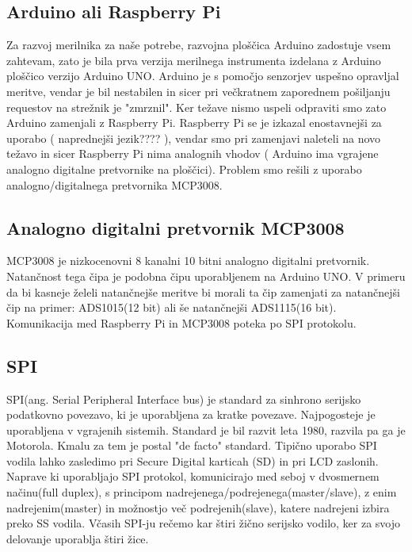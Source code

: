 \documentclass[12pt,a4paper,titlepage,openany]{report}
\begin{document}
\subsection{Arduino ali Raspberry Pi}
Za razvoj merilnika za naše potrebe, razvojna ploščica Arduino zadostuje vsem zahtevam, zato je bila prva verzija merilnega instrumenta izdelana z Arduino ploščico verzijo Arduino UNO. Arduino je s pomočjo senzorjev uspešno opravljal meritve, vendar je bil nestabilen in sicer pri večkratnem zaporednem pošiljanju requestov na strežnik  je "zmrznil". Ker težave nismo uspeli odpraviti smo zato Arduino zamenjali z Raspberry Pi. Raspberry Pi se je izkazal enostavnejši za uporabo ( naprednejši jezik???? ), vendar smo pri zamenjavi naleteli na novo težavo in sicer Raspberry Pi nima analognih vhodov ( Arduino ima vgrajene analogno digitalne pretvornike na ploščici). Problem smo rešili z uporabo analogno/digitalnega pretvornika MCP3008.

\subsection{Analogno digitalni pretvornik MCP3008}
MCP3008 je nizkocenovni 8 kanalni 10 bitni analogno digitalni pretvornik. Natančnost tega čipa je podobna čipu uporabljenem na Arduino UNO. V primeru da bi kasneje želeli natančnejše meritve bi morali ta čip zamenjati za natančnejši čip na primer: ADS1015(12 bit) ali še natančnejši ADS1115(16 bit). Komunikacija med Raspberry Pi in MCP3008 poteka po SPI protokolu.

\subsection{SPI}
SPI(ang. Serial Peripheral Interface bus) je standard za sinhrono serijsko podatkovno povezavo, ki je uporabljena za kratke povezave. Najpogosteje je uporabljena v vgrajenih sistemih. Standard je bil razvit leta 1980, razvila pa ga je Motorola. Kmalu za tem je postal "de facto" standard. Tipično uporabo SPI vodila lahko zasledimo pri Secure Digital karticah (SD) in pri LCD zaslonih. Naprave ki uporabljajo SPI protokol, komunicirajo med seboj v dvosmernem načinu(full duplex), s principom nadrejenega/podrejenega(master/slave), z enim nadrejenim(master) in možnostjo več podrejenih(slave), katere nadrejeni izbira preko SS vodila. Včasih SPI-ju rečemo kar štiri žično serijsko vodilo, ker za svojo delovanje uporablja štiri žice.
\end{document}
